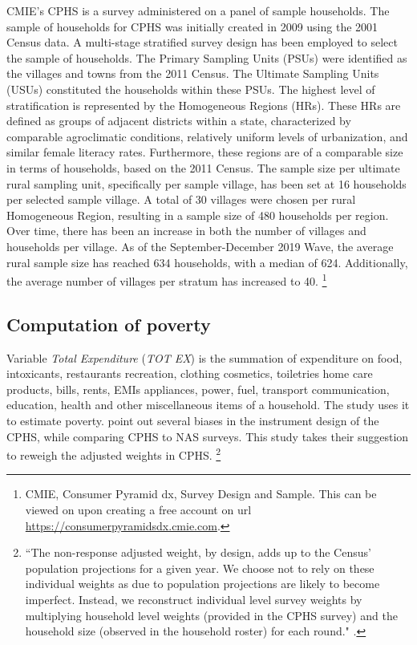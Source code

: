 \documentclass [12pt]{article}
\begin{document}
\text CMIE's CPHS is a survey administered on a panel of sample households. The sample of households for CPHS was initially created in 2009 using the 2001 Census data. A multi-stage stratified survey design has been employed to select the sample of households. The Primary Sampling Units (PSUs) were identified as the villages and towns from the 2011 Census. The Ultimate Sampling Units (USUs) constituted the households within these PSUs. The highest level of stratification is represented by the Homogeneous Regions (HRs). These HRs are defined as groups of adjacent districts within a state, characterized by comparable agroclimatic conditions, relatively uniform levels of urbanization, and similar female literacy rates. Furthermore, these regions are of a comparable size in terms of households, based on the 2011 Census. 
\text The sample size per ultimate rural sampling unit, specifically per sample village, has been set at 16 households per selected sample village. A total of 30 villages were chosen per rural Homogeneous Region, resulting in a sample size of 480 households per region. Over time, there has been an increase in both the number of villages and households per village. As of the September-December 2019 Wave, the average rural sample size has reached 634 households, with a median of 624. Additionally, the average number of villages per stratum has increased to 40. \footnote{CMIE, Consumer Pyramid dx, Survey Design and Sample. This can be viewed on upon creating a free account on url \url{https://consumerpyramidsdx.cmie.com}.}

\newpage
\subsection{Computation of poverty}
\par \vspace{0.3cm}

\text Variable \textit{Total Expenditure} (\textit{TOT EX}) is the summation of expenditure on food, intoxicants, restaurants recreation, clothing cosmetics, toiletries home care products, bills, rents, EMIs appliances, power, fuel, transport communication, education, health and other miscellaneous items of a household. The study uses it to estimate poverty. \textcite{roy2022poverty} point out several biases in the instrument design of the CPHS, while comparing CPHS to NAS surveys. This study takes their suggestion to reweigh the adjusted weights in CPHS. \footnote{``The non-response adjusted weight, by design, adds up to the Census’ population projections for a given year. We choose not to rely on these individual weights as due to population projections are likely to become imperfect. Instead, we reconstruct individual level survey weights by multiplying household level weights (provided in the CPHS survey) and the household size (observed in the household roster) for each round." \parencite[11]{roy2022poverty}.}
\end{document}
